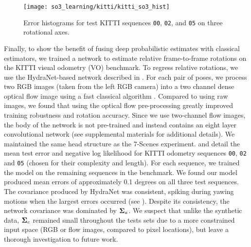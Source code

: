 \begin{figure}
	\centering
	\texttt{[image: so3\_learning/kitti/kitti\_so3\_hist]}
	\caption{Error histograms for test KITTI sequences \texttt{00}, \texttt{02}, and \texttt{05} on three rotational axes.}
	\label{fig:kitti_hists}
	\vspace{-.5em}
\end{figure}

Finally, to show the benefit of fusing deep probabilistic estimates with classical estimators, we trained a network to estimate relative frame-to-frame rotations on the KITTI visual odometry (VO) benchmark. To regress relative rotations, we use the HydraNet-based network described in . For each pair of poses, we process two RGB images (taken from the left RGB camera) into a two channel dense optical flow image using a fast classical algorithm \citep{farneback2003}. Compared to using raw images, we found that using the optical flow pre-processing greatly improved training robustness and rotation accuracy. Since we use two-channel flow images, the body of the network is not pre-trained and instead contains an eight layer convolutional network (see supplemental materials for additional details). We maintained the same head structure as the 7-Scenes experiment.  and  detail the mean test error and negative log likelihood for KITTI odometry sequences \texttt{00}, \texttt{02} and \texttt{05} (chosen for their complexity and length). For each sequence, we trained the model on the remaining sequences in the benchmark. We found our model produced mean errors of approximately 0.1 degrees on all three test sequences. The covariance produced by HydraNet was consistent, spiking during yawing motions when the largest errors occurred (see ). Despite its consistency, the network covariance was dominated by $\boldsymbol{\mathbf{\Sigma}}_a$. We suspect that unlike the synthetic data, $\boldsymbol{\mathbf{\Sigma}}_e$ remained small throughout the tests sets due to a more constrained input space (RGB or flow images, compared to pixel locations), but leave a thorough investigation to future work. 
 
